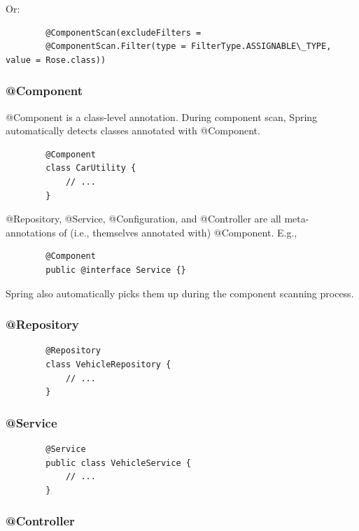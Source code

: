 \documentclass{scrartcl}
\begin{document}
    Or:
    \begin{lstlisting}
        @ComponentScan(excludeFilters =
        @ComponentScan.Filter(type = FilterType.ASSIGNABLE\_TYPE, value = Rose.class))
    \end{lstlisting}

\subsubsection{@Component}

    @Component is a class-level annotation. During component scan, Spring automatically detects classes annotated with @Component.

    \begin{lstlisting}
        @Component
        class CarUtility {
            // ...
        }
    \end{lstlisting}

    @Repository, @Service, @Configuration, and @Controller are all meta-annotations of (i.e., themselves annotated with) @Component. E.g.,

      \begin{lstlisting}
        @Component
        public @interface Service {}
    \end{lstlisting}

    Spring also automatically picks them up during the component scanning process.


\subsubsection{@Repository}

    \begin{lstlisting}
        @Repository
        class VehicleRepository {
            // ...
        }
    \end{lstlisting}

\subsubsection{@Service}

    \begin{lstlisting}
        @Service
        public class VehicleService {
            // ...
        }
    \end{lstlisting}

\subsubsection{@Controller}
\end{document}

